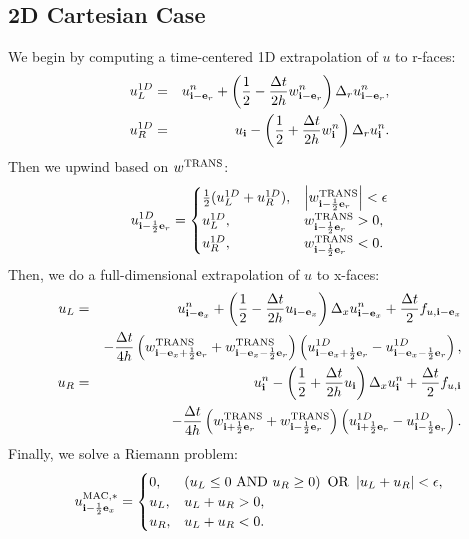 \documentclass[11pt]{article}
\def\half  {\frac{1}{2}}
\def\dt    {\Delta t}
\def\mac   {\rm MAC}
\def\trans {\rm TRANS}
\def\eb    {{\bf e}}
\def\ib    {{\bf i}}
\begin{document}
\subsection{2D Cartesian Case}
We begin by computing a time-centered 1D extrapolation of $u$ to r-faces:
\begin{eqnarray}
u_L^{1D} &=& u_{\ib-\eb_r}^n + \left(\half - \frac{\dt}{2h}w_{\ib-\eb_r}^n\right)\Delta_r u_{\ib-\eb_r}^n, \\
u_R^{1D} &=& u_{\ib} - \left(\half + \frac{\dt}{2h}w_{\ib}^n\right)\Delta_r u_{\ib}^n.
\end{eqnarray}
Then we upwind based on $w^{\trans}$:
\begin{equation}
u_{\ib-\half\eb_r}^{1D} =
\begin{cases}
\half(u_L^{1D} + u_R^{1D}), & \left|w^{\trans}_{\ib-\half\eb_r}\right| < \epsilon \\
u_L^{1D}, & w^{\trans}_{\ib-\half\eb_r} > 0, \\
u_R^{1D}, & w^{\trans}_{\ib-\half\eb_r} < 0. \\
\end{cases}
\end{equation}
Then, we do a full-dimensional extrapolation of $u$ to x-faces:
\begin{eqnarray}
u_L &=& u_{\ib-\eb_x}^n + \left(\half - \frac{\dt}{2h}u_{\ib-\eb_x}\right)\Delta_x u_{\ib-\eb_x}^n + \frac{\dt}{2}f_{u,\ib-\eb_x} \nonumber \\
&& - \frac{\dt}{4h}\left(w_{\ib-\eb_x+\half\eb_r}^{\trans}+w_{\ib-\eb_x-\half\eb_r}^{\trans}\right)\left(u_{\ib-\eb_x+\half\eb_r}^{1D} - u_{\ib-\eb_x-\half\eb_r}^{1D}\right), \\
u_R &=& u_{\ib}^n - \left(\half + \frac{\dt}{2h}u_{\ib}\right)\Delta_x u_{\ib}^n + \frac{\dt}{2}f_{u,\ib} \nonumber \\
&& - \frac{\dt}{4h}\left(w_{\ib+\half\eb_r}^{\trans}+w_{\ib-\half\eb_r}^{\trans}\right)\left(u_{\ib+\half\eb_r}^{1D} - u_{\ib-\half\eb_r}^{1D}\right).
\end{eqnarray}
Finally, we solve a Riemann problem:
\begin{equation}
u_{\ib-\half\eb_x}^{\mac,*} =
\begin{cases}
0, & \left(u_L \le 0 ~ {\rm AND} ~ u_R \ge 0\right) ~ {\rm OR} ~ \left|u_L + u_R\right| < \epsilon, \\
u_L, & u_L + u_R > 0, \\
u_R, & u_L + u_R < 0. 
\end{cases}
\end{equation}
\end{document}
